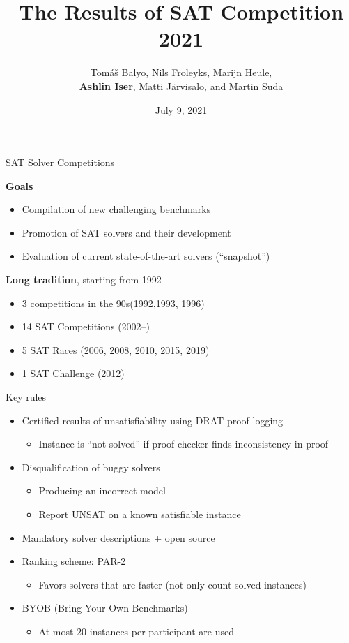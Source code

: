 \documentclass[trans]{beamer}
\title[SAT Competition 2021]{The Results of SAT Competition 2021}
\author[Balyo, Froleyks, Heule, Iser, J\"{a}rvisalo, Suda] {Tom{\'a}{\v s} Balyo, Nils Froleyks, Marijn Heule,\\
{\bf Ashlin Iser}, Matti J\"{a}rvisalo, and Martin Suda}
\institute[] %
{
SAT 2021 Conference, Barcelona (Spain), +Cyberspace \\ %
}
\date{July 9, 2021} %
\begin{document}
\begin{frame}
\titlepage %
\end{frame}

\begin{frame}{SAT Solver Competitions}

{\bf Goals}
\begin{itemize}
\item Compilation of new challenging benchmarks
\item Promotion of SAT solvers and their development
\item Evaluation of current state-of-the-art solvers (``snapshot'')
\end{itemize}

\bigskip

{\bf Long tradition}, starting from 1992
\begin{itemize}
\item 3 competitions in the 90s\hfill (1992,1993, 1996)
\item 14 SAT Competitions \hfill (2002--)
\item 5 SAT Races \hfill (2006, 2008, 2010, 2015, 2019)
\item 1 SAT Challenge \hfill (2012)
\end{itemize}

\end{frame}


\begin{frame}{Key rules}

\begin{itemize}
\item Certified results of unsatisfiability using DRAT proof logging
  \begin{itemize}
  \item Instance is ``not solved'' if proof checker finds inconsistency in proof
  \end{itemize}
\medskip
\item Disqualification of buggy solvers
  \begin{itemize}
  \item Producing an incorrect model
  \item Report UNSAT on a known satisfiable instance
  \end{itemize}
\medskip
\item Mandatory solver descriptions + open source
\medskip
\item Ranking scheme: PAR-2
\begin{itemize}
\item Favors solvers that are faster (not only count solved instances)
\end{itemize}
\medskip
\item BYOB (Bring Your Own Benchmarks)
\begin{itemize}
\item At most 20 instances per participant are used
\end{itemize} 
\end{itemize}

\end{frame}
\end{document}
